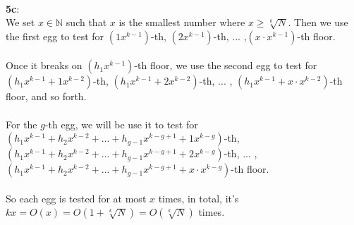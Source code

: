 \documentclass[12pt]{article}
\begin{document}
\\
\textbf{5c}:\\
We set $x\in \mathbb{N}$ such that $x$ is the smallest number where $x \geq \sqrt[k]{N}$. Then we use the first egg to test for $(1x^{k-1})$-th, $(2x^{k-1})$-th, ... ,$(x\cdot x^{k-1})$-th floor.\\
\\
Once it breaks on $(h_1x^{k-1})$-th floor, we use the second egg to test for\\
 $(h_1x^{k-1} + 1x^{k-2})$-th, $(h_1x^{k-1} + 2x^{k-2})$-th, ... , $(h_1x^{k-1} + x \cdot x^{k-2})$-th floor, and so forth.\\
\\
For the $g$-th egg, we will be use it to test for\\
$(h_1x^{k-1} +h_2x^{k-2} + ... + h_{g-1}x^{k-g+1} +1x^{k-g})$-th, $(h_1x^{k-1} +h_2x^{k-2} + ... + h_{g-1}x^{k-g+1} +2x^{k-g})$-th,  ... , $(h_1x^{k-1} +h_2x^{k-2} + ... + h_{g-1}x^{k-g+1} +x\cdot x^{k-g})$-th floor.\\
\\
So each egg is tested for at most $x$ times, in total, it's $kx = O(x) = O(1 + \sqrt[k]{N}) = O(\sqrt[k]{N})$ times.











	
\end{document}
